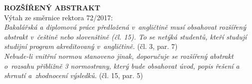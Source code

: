\cleardoublepage
\noindent
{\large\sffamily\bfseries\MakeUppercase{Rozšířený abstrakt}}
\\
Výtah ze směrnice rektora 72/2017:\\
\emph{Bakalářská a diplomová práce předložená v~angličtině musí obsahovat rozšířený abstrakt v~češtině
nebo slovenštině (čl. 15). To se netýká studentů, kteří studují studijní program akreditovaný
v~angličtině.}
(čl. 3, par. 7)\\
\emph{Nebude-li vnitřní normou stanoveno jinak, doporučuje se rozšířený abstrakt o~rozsahu přibližně 3
normostrany, který bude obsahovat úvod, popis řešení a shrnutí a~zhodnocení výsledků.}
(čl. 15, par. 5)